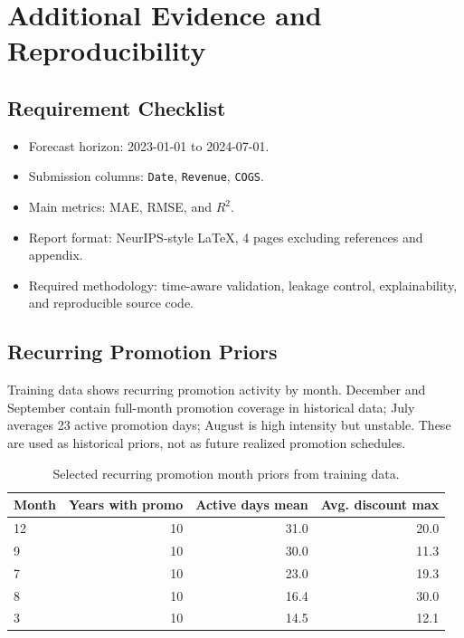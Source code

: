 \section{Additional Evidence and Reproducibility}

\subsection{Requirement Checklist}
\begin{itemize}
  \item Forecast horizon: 2023-01-01 to 2024-07-01.
  \item Submission columns: \texttt{Date}, \texttt{Revenue}, \texttt{COGS}.
  \item Main metrics: MAE, RMSE, and $R^2$.
  \item Report format: NeurIPS-style LaTeX, 4 pages excluding references and appendix.
  \item Required methodology: time-aware validation, leakage control, explainability, and reproducible source code.
\end{itemize}

\subsection{Recurring Promotion Priors}
Training data shows recurring promotion activity by month. December and September contain full-month promotion coverage in historical data; July averages 23 active promotion days; August is high intensity but unstable. These are used as historical priors, not as future realized promotion schedules.

\begin{table}[h]
\centering
\caption{Selected recurring promotion month priors from training data.}
\begin{tabular}{lrrr}
\toprule
Month & Years with promo & Active days mean & Avg. discount max \\
\midrule
12 & 10 & 31.0 & 20.0 \\
9 & 10 & 30.0 & 11.3 \\
7 & 10 & 23.0 & 19.3 \\
8 & 10 & 16.4 & 30.0 \\
3 & 10 & 14.5 & 12.1 \\
\bottomrule
\end{tabular}
\end{table}

